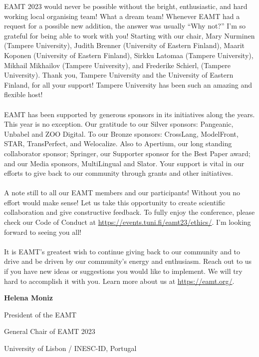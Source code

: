 \documentclass[a4paper,11pt,twoside]{book}
\begin{document}
\begin{onehalfspacing}
EAMT 2023 would never be possible without the bright, enthusiastic, and hard working local organising team! What a dream team! Whenever EAMT had a request for a possible new addition, the answer was usually “Why not?” I’m so grateful for being able to work with you! Starting with our chair, Mary Nurminen (Tampere University), Judith Brenner (University of Eastern Finland), Maarit Koponen (University of Eastern Finland), Sirkku Latomaa (Tampere University),  Mikhail Mikhailov (Tampere University), and Frederike Schierl, (Tampere University). Thank you, Tampere University and the University of Eastern Finland, for all your support! Tampere University has been such an amazing and flexible host!\\
\\
\noindent
EAMT has been supported by generous sponsors in its initiatives along the years. This year is no exception. Our gratitude to our Silver sponsors: Pangeanic, Unbabel and ZOO Digital. To our Bronze sponsors: CrossLang, ModelFront, STAR, TransPerfect, and Welocalize. Also to Apertium, our long standing collaborator sponsor;  Springer, our Supporter sponsor for the Best Paper award; and our Media sponsors, MultiLingual and Slator. Your support is vital in our efforts to give back to our community through grants and other initiatives.\\
\\
\noindent
A note still to all our EAMT members and our participants! Without you no effort would make sense! Let us take this opportunity to create scientific collaboration and give constructive feedback. To fully enjoy the conference, please check our Code of Conduct at \url{https://events.tuni.fi/eamt23/ethics/}. I’m looking forward to seeing you all!\\ 
\\
\noindent
It is EAMT’s greatest wish to continue giving back to our community and to drive and be driven by our community’s energy and enthusiasm. Reach out to us if you have new ideas or suggestions you would like to implement. We will try hard to accomplish it with you. Learn more about us at \url{https://eamt.org/}.
\vspace{1cm}

\noindent \textbf{Helena Moniz}

\noindent President of the EAMT

\noindent General Chair of EAMT 2023

\noindent University of Lisbon / INESC-ID, Portugal

\let\cleardoublepage\clearpage


\end{onehalfspacing}
\end{document}
